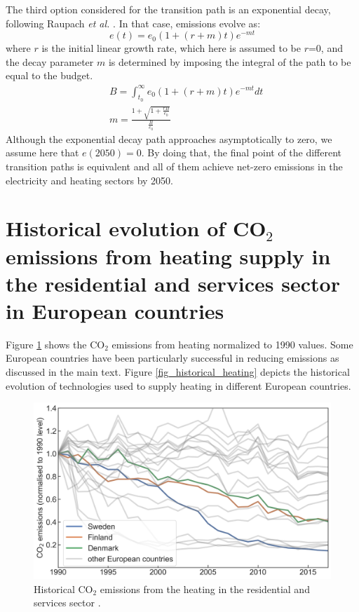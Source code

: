 \documentclass[3p]{elsarticle} %
\begin{document}
The third option considered for the transition path is an exponential decay, following Raupach \textit{et al. }\cite{Raupach_2014}. In that case, emissions evolve as:
\begin{equation}
e(t) = e_0(1+(r+m)t)e^{-mt}
\end{equation}
where $r$ is the initial linear growth rate, which here is assumed to be $r$=0, and the decay parameter $m$ is determined by imposing the integral of the path to be equal to the budget.
\begin{equation}
\begin{aligned}
& B=\int_{t_0}^{\infty} e_0(1+(r+m)t)e^{-mt} dt \\
& m=\frac{1+ \sqrt{1+\frac{rB}{e_0}}}{\frac{B}{e_0}}
\end{aligned}
\end{equation}
Although the exponential decay path approaches asymptotically to zero, we assume here that $e(2050)=0$. By doing that, the final point of the different transition paths is equivalent and all of them achieve net-zero emissions in the electricity and heating sectors by 2050.

\FloatBarrier

\newpage

\section{Historical evolution of CO$_2$ emissions from heating supply in the residential and services sector in European countries}
Figure \ref{fig_emissions_heating} shows the CO$_2$ emissions from heating normalized to 1990 values. Some European countries have been particularly successful in reducing emissions as discussed in the main text. Figure \ref{fig_historical_heating} depicts the historical evolution of technologies used to supply heating in different European countries. 

\begin{figure}[!h]
\centering
\includegraphics[width=12cm]{figures/emissions_heating.png}
\caption{Historical CO$_2$ emissions from the heating in the residential and services sector \cite{UNFCCC_inventory}. } \label{fig_emissions_heating} 
\end{figure}
\end{document}
